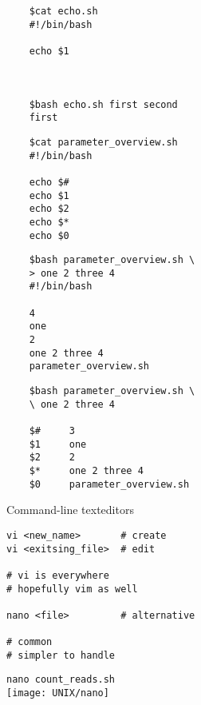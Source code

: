 \documentclass[xcolor=dvipsnames]{beamer}
\begin{document}
\begin{frame}[fragile]
\LARGE
\begin{verbatim}
	$cat echo.sh
	#!/bin/bash
	
	echo $1
	
	
	
	$bash echo.sh first second
	first
\end{verbatim}
\end{frame}

\begin{frame}[fragile]
\LARGE
\begin{verbatim}
	$cat parameter_overview.sh
	#!/bin/bash
	
	echo $#
	echo $1
	echo $2
	echo $*
	echo $0
\end{verbatim}
\end{frame}

\begin{frame}[fragile]
\LARGE
\begin{verbatim}
	$bash parameter_overview.sh \
	> one 2 three 4
	#!/bin/bash
	
	4
	one
	2
	one 2 three 4
	parameter_overview.sh
\end{verbatim}
\end{frame}

\begin{frame}[fragile]
\LARGE
\begin{verbatim}
	$bash parameter_overview.sh \
	\ one 2 three 4
	
	$#     3
	$1     one
	$2     2
	$*     one 2 three 4
	$0     parameter_overview.sh
\end{verbatim}
\end{frame}

\begin{frame}[fragile]
	\begin{center}
		\Huge
		Command-line texteditors
	\end{center}
	\Large
\begin{verbatim}
vi <new_name>       # create
vi <exitsing_file>  # edit

# vi is everywhere
# hopefully vim as well

nano <file>         # alternative

# common
# simpler to handle
\end{verbatim}
\end{frame}

\begin{frame}[fragile]
	\begin{center}
		\Large
		\verb!nano count_reads.sh! \\
		\vspace{1cm}
		\texttt{[image: UNIX/nano]}
	\end{center}
\end{frame}	
\end{document}
